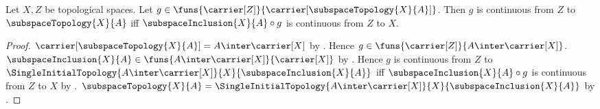 \begin{theorem}\label{subspace_universal_property}
    Let $X,Z$ be topological spaces.
    Let $g\in\funs{\carrier[Z]}
        {\carrier[\subspaceTopology{X}{A}]}$.
    Then $g$ is continuous from $Z$ to $\subspaceTopology{X}{A}$ iff
        $\subspaceInclusion{X}{A}\circ g$ is continuous from $Z$ to $X$.
\end{theorem}
\begin{proof}
    $\carrier[\subspaceTopology{X}{A}]=A\inter\carrier[X]$ by
        .
    Hence $g\in\funs{\carrier[Z]}{A\inter\carrier[X]}$.
    $\subspaceInclusion{X}{A}\in
        \funs{A\inter\carrier[X]}{\carrier[X]}$ by
        .
    Hence $g$ is continuous from $Z$ to
        $\SingleInitialTopology{A\inter\carrier[X]}{X}
            {\subspaceInclusion{X}{A}}$ iff
        $\subspaceInclusion{X}{A}\circ g$ is continuous from $Z$ to $X$ by
        .
    $\subspaceTopology{X}{A}
        =\SingleInitialTopology{A\inter\carrier[X]}{X}
            {\subspaceInclusion{X}{A}}$ by
        .
\end{proof}


